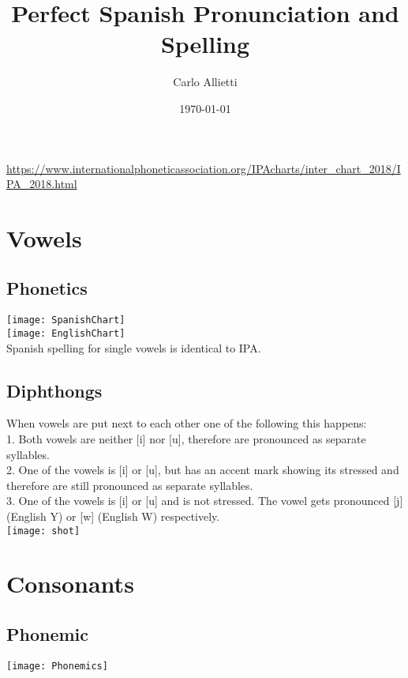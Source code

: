 \documentclass{article}
\begin{document}
\title{Perfect Spanish Pronunciation and Spelling}
\author{Carlo Allietti}
\date{\today}
\maketitle

\url{https://www.internationalphoneticassociation.org/IPAcharts/inter_chart_2018/IPA_2018.html}

\section{Vowels}

\subsection{Phonetics}
\texttt{[image: SpanishChart]}\\

\texttt{[image: EnglishChart]}\\
Spanish spelling for single vowels is identical to IPA.

\subsection{Diphthongs}
When vowels are put next to each other one of the following this happens:\\

1. Both vowels are neither [i] nor [u], therefore are pronounced as separate syllables.\\

2. One of the vowels is [i] or [u], but has an accent mark showing its stressed and therefore are still pronounced as separate syllables.\\

3. One of the vowels is [i] or [u] and is not stressed. The vowel gets pronounced [j] (English Y) or [w] (English W) respectively.\\

\texttt{[image: shot]}

\section{Consonants}
\subsection{Phonemic}

\texttt{[image: Phonemics]}
\end{document}
